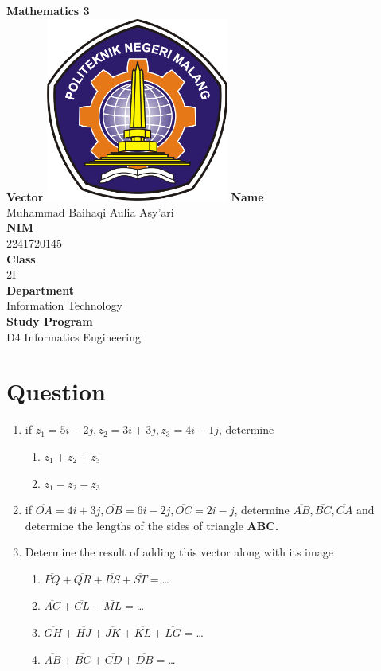 \documentclass[12pt,titlepage]{article}
\newcommand{\vSubject}{Mathematics 3}
\newcommand{\vSubtitle}{Vector}
\newcommand{\vName}{Muhammad Baihaqi Aulia Asy'ari}
\newcommand{\vNIM}{2241720145}
\newcommand{\vClass}{2I}
\newcommand{\vDepartment}{Information Technology}
\newcommand{\vStudyProgram}{D4 Informatics Engineering}
\begin{document}
\begin{titlepage}
    \centering
    \vfill
    {\bfseries\LARGE
        \vSubject\\
        \vskip0.25cm
        \vSubtitle
    }
    \vfill
    \includegraphics[width=6cm]{images/polinema-logo.png}
    \vfill
    {
        \textbf{Name}\\
        \vName\\
        \vskip0.5cm
        \textbf{NIM}\\
        \vNIM\\
        \vskip0.5cm
        \textbf{Class}\\
        \vClass\\
        \vskip0.5cm
        \textbf{Department}\\
        \vDepartment\\
        \vskip0.5cm
        \textbf{Study Program}\\
        \vStudyProgram
    }
\end{titlepage}

\newpage

\section*{Question}
\begin{enumerate}
    \item if $z_1=5i-2j, z_2=3i+3j,z_3=4i-1j$, determine 
    \begin{enumerate}[label=\alph*)]
        \item $z_1+z_2+z_3$
        \item $z_1-z_2-z_3$
    \end{enumerate}
    \item if $\overline{OA}=4i+3j, \overline{OB}=6i-2j, \overline{OC}=2i-j$, determine $\overline{AB}, \overline{BC}, \overline{CA}$ and determine the lengths of the sides of triangle \textbf{ABC.}
    \item Determine the result of adding this vector along with its image
    \begin{enumerate}[label=\alph*)]
        \item $\overline{PQ}+\overline{QR}+\overline{RS}+\overline{ST}=$\dots
        \item $\overline{AC}+\overline{CL}-\overline{ML}=$\dots
        \item $\overline{GH}+\overline{HJ}+\overline{JK}+\overline{KL}+\overline{LG}=$\dots
        \item $\overline{AB}+\overline{BC}+\overline{CD}+\overline{DB}=$\dots
    \end{enumerate}
\end{enumerate}
\end{document}
